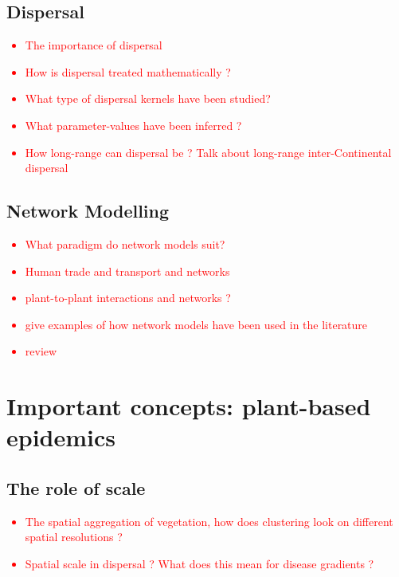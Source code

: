 \subsection{Dispersal}
\textcolor{red}{
\begin{itemize}
    \item The importance of dispersal
    \item How is dispersal treated mathematically ?
    \item What type of dispersal kernels have been studied?
    \item What parameter-values have been inferred ?
    \item How long-range can dispersal be ? Talk about long-range inter-Continental dispersal
\end{itemize}}
\blindtext

\subsection{Network Modelling}
\textcolor{red}{
\begin{itemize}
    \item What paradigm do network models suit?
    \item Human trade and transport and networks 
    \item plant-to-plant interactions and networks ? 
    \item give examples of how network models have been used in the literature
    \item review \cite{doi:10.1098/rsif.2005.0051}
\end{itemize}}
\blindtext

\section{Important concepts: plant-based epidemics}

\subsection{The role of scale}
\textcolor{red}{
\begin{itemize}
    \item The spatial aggregation of vegetation, how does clustering look on different spatial resolutions ?
    \item Spatial scale in dispersal ? What does this mean for disease gradients ?
\end{itemize}}
\blindtext

